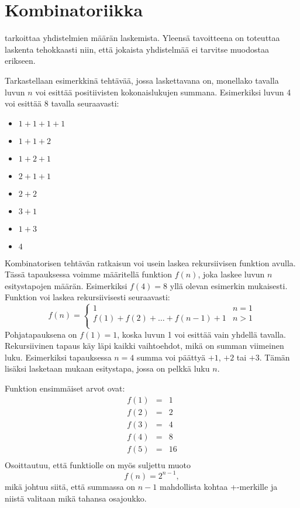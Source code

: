 \chapter{Kombinatoriikka}


 tarkoittaa yhdistelmien määrän laskemista.
Yleensä tavoitteena on toteuttaa laskenta
tehokkaasti niin, että jokaista yhdistelmää
ei tarvitse muodostaa erikseen.

Tarkastellaan esimerkkinä tehtävää,
jossa laskettavana on,
monellako tavalla luvun $n$ voi esittää positiivisten
kokonaislukujen summana.
Esimerkiksi luvun 4 voi esittää 8 tavalla
seuraavasti:
\begin{multicols}{2}
\begin{itemize}
\item $1+1+1+1$
\item $1+1+2$
\item $1+2+1$
\item $2+1+1$
\item $2+2$
\item $3+1$
\item $1+3$
\item $4$
\end{itemize}
\end{multicols}

Kombinatorisen tehtävän ratkaisun voi usein
laskea rekursiivisen funktion avulla.
Tässä tapauksessa voimme määritellä funktion $f(n)$,
joka laskee luvun $n$ esitystapojen määrän.
Esimerkiksi $f(4)=8$ yllä olevan esimerkin mukaisesti.
Funktion voi laskea rekursiivisesti seuraavasti:
\begin{equation*}
    f(n) = \begin{cases}
               1               & n = 1\\
               f(1)+f(2)+\ldots+f(n-1)+1 & n > 1\\
           \end{cases}
\end{equation*}
Pohjatapauksena on $f(1)=1$,
koska luvun 1 voi esittää vain yhdellä tavalla.
Rekursiivinen tapaus käy läpi
kaikki vaihtoehdot,
mikä on summan viimeinen luku.
Esimerkiksi tapauksessa $n=4$ summa voi päättyä
$+1$, $+2$ tai $+3$.
Tämän lisäksi lasketaan mukaan esitystapa,
jossa on pelkkä luku $n$.

Funktion ensimmäiset arvot ovat:
\[
\begin{array}{lcl}
f(1) & = & 1 \\
f(2) & = & 2 \\
f(3) & = & 4 \\
f(4) & = & 8 \\
f(5) & = & 16 \\
\end{array}
\]
Osoittautuu, että funktiolle on myös suljettu muoto
\[
f(n)=2^{n-1},
\]
mikä johtuu siitä, että summassa on $n-1$ mahdollista
kohtaa +-merkille ja niistä valitaan mikä tahansa osajoukko.


